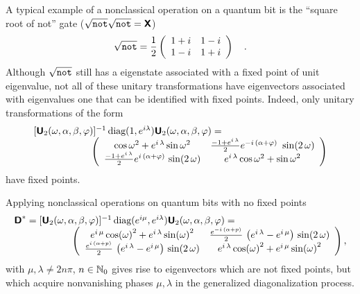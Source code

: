 \documentclass[prl,amsfonts,amsmath,showpacs,showkeys,preprint]{revtex4}
\begin{document}
A typical example of a nonclassical operation on a quantum bit is
the ``square root of not'' gate
($
\sqrt{{\tt not}}
\sqrt{{\tt not}} =\textsf{\textbf{X}}$)
\begin{equation}
\sqrt{{\tt not}} =
{1 \over 2}
\left(
\begin{array}{cc}
1+i&1-i
\\
1-i&1+i
 \end{array}
\right)
\quad .
\end{equation}
Although $
\sqrt{{\tt not}}
$
still has a eigenstate  associated with a fixed point of unit eigenvalue,
not all of these unitary transformations have eigenvectors
associated with eigenvalues one that can be identified with fixed points.
Indeed, only unitary transformations of the form
\begin{equation}
\begin{array}{l}
[\textsf{\textbf{U}}_2(\omega ,\alpha ,\beta ,\varphi )]^{-1}\,\mbox{diag}(1, e^{i\lambda
}) \textsf{\textbf{U}}_2(\omega ,\alpha ,\beta ,\varphi )=  \\
\qquad
\qquad
\qquad
\left(
\begin{array}{cc}
{{\cos \omega }^2} + {e^{i\,\lambda }}\,{{\sin \omega }^2}&
{{{
{-1 + {e^{i\,\lambda
}}\over 2}
e^{-i\,\left(\alpha +\varphi \right) }}\,
\, \sin (2\,\omega )}} \\
{ -1 + {e^{i\,\lambda }}\over 2}
 {{{e^{i\,\left(\alpha
+\varphi \right) }}\,
 \sin
(2\,\omega )}}&
{e^{i\,\lambda }}\,{{\cos \omega }^2} + {{\sin
\omega }^2}
 \end{array}
\right)
 \end{array}
\end{equation}
have fixed points.

Applying nonclassical operations on quantum bits with no fixed points
\begin{equation}
\begin{array}{l}
\textsf{\textbf{D}}^\ast =[\textsf{\textbf{U}}_2(\omega ,\alpha ,\beta ,\varphi )]^{-1}\,\mbox{diag}( e^{i\mu } ,
e^{i\lambda }) \textsf{\textbf{U}}_2(\omega ,\alpha ,\beta ,\varphi )=  \\
\qquad
\qquad
\qquad
\left(
\begin{array}{cc}
  {e^{i\,\mu }}\,{{\cos (\omega )}^2} +
     {e^{i\,\lambda }}\,{{\sin (\omega )}^2}&
    {{{e^{-i\,\left( \alpha  + p \right) }\over 2}}\,
         \left( {e^{i\,\lambda }} - {e^{i\,\mu }} \right) \,\sin
(2\,\omega )}
       \\
{{{e^{i\,\left( \alpha  + p \right) }\over 2}}\,
        \left( {e^{i\,\lambda }} - {e^{i\,\mu }}  \right) \,\sin
(2\,\omega )}
       &{e^{i\,\lambda }}\,{{\cos (\omega )}^2} +
     {e^{i\,\mu }}\,{{\sin (\omega )}^2}
 \end{array}
\right) ,
 \end{array}
\end{equation}
with $\mu ,\lambda \neq 2n\pi$, $n\in {\Bbb N}_0$ gives rise to
eigenvectors which are not fixed points, but which acquire nonvanishing
phases $\mu , \lambda$ in the generalized diagonalization process.
\end{document}
